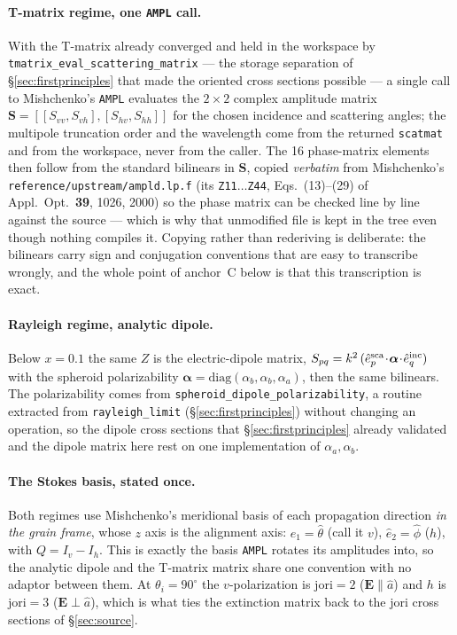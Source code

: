 \documentclass{my_memo}
\newcommand{\code}[1]{\texttt{#1}}
\begin{document}
\paragraph{T-matrix regime, one \code{AMPL} call.} With the T-matrix already
converged and held in the workspace by
\code{tmatrix\_eval\_scattering\_matrix} --- the storage separation of
\S\ref{sec:firstprinciples} that made the oriented cross sections
possible --- a single call to Mishchenko's \code{AMPL} evaluates the $2\times2$
complex amplitude matrix $\mathbf{S}=[[S_{vv},S_{vh}],[S_{hv},S_{hh}]]$ for the
chosen incidence and scattering angles; the multipole truncation order and the
wavelength come from the returned \code{scatmat} and from the workspace, never
from the caller. The 16 phase-matrix elements then follow
from the standard bilinears in $\mathbf{S}$, copied \emph{verbatim} from
Mishchenko's \code{reference/upstream/ampld.lp.f} (its
\code{Z11}$\ldots$\code{Z44}, Eqs.\
(13)--(29) of Appl.\ Opt.\ \textbf{39}, 1026, 2000) so the phase matrix can be
checked line by line against the source --- which is why that unmodified file is
kept in the tree even though nothing compiles it. Copying rather than rederiving is
deliberate: the bilinears carry sign and conjugation conventions that are easy to
transcribe wrongly, and the whole point of anchor~C below is that this transcription
is exact.

\paragraph{Rayleigh regime, analytic dipole.} Below $x=0.1$ the same $Z$ is the
electric-dipole matrix, $S_{pq}=k^2\,(\hat e_p^{\rm sca}\!\cdot\!\boldsymbol\alpha
\!\cdot\!\hat e_q^{\rm inc})$ with the spheroid polarizability
$\boldsymbol\alpha=\mathrm{diag}(\alpha_b,\alpha_b,\alpha_a)$, then the same
bilinears. The polarizability comes from \code{spheroid\_dipole\_polarizability},
a routine extracted from \code{rayleigh\_limit} (\S\ref{sec:firstprinciples})
without changing an operation, so the dipole cross sections that
\S\ref{sec:firstprinciples} already validated and the dipole matrix here rest on
one implementation of $\alpha_a,\alpha_b$.

\paragraph{The Stokes basis, stated once.} Both regimes use Mishchenko's
meridional basis of each propagation direction \emph{in the grain frame}, whose
$z$ axis is the alignment axis: $\hat e_1=\hat\theta$ (call it $v$), $\hat
e_2=\hat\phi$ ($h$), with $Q=I_v-I_h$. This is exactly the basis \code{AMPL}
rotates its amplitudes into, so the analytic dipole and the T-matrix matrix share
one convention with no adaptor between them. At $\theta_i=90^\circ$ the
$v$-polarization is $\mathrm{jori}=2$ ($\mathbf{E}\parallel\hat a$) and $h$ is
$\mathrm{jori}=3$ ($\mathbf{E}\perp\hat a$), which is what ties the extinction
matrix back to the jori cross sections of \S\ref{sec:source}.
\end{document}
